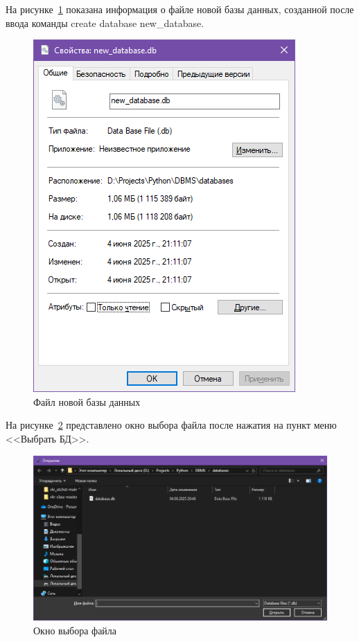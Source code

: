 На рисунке~\ref{fig:new_db} показана информация о файле новой базы данных, созданной после ввода команды create database new\_database.
\begin{figure}[H]
	\centering
	\includegraphics[width=0.9\linewidth]{"images/новая бд"}
	\caption{Файл новой базы данных}
	\label{fig:new_db}
\end{figure}

На рисунке~\ref{fig:select} представлено окно выбора файла после нажатия на пункт меню <<Выбрать БД>>.
\begin{figure}[H]
	\centering
	\includegraphics[width=0.9\linewidth]{"images/выбор файла"}
	\caption{Окно выбора файла}
	\label{fig:select}
\end{figure}

